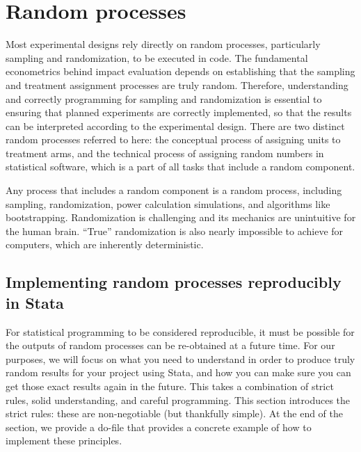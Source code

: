 
\section{Random processes}

Most experimental designs rely directly on random processes,
particularly sampling and randomization, to be executed in code.
The fundamental econometrics behind impact evaluation
depends on establishing that the sampling
and treatment assignment processes are truly random.
Therefore, understanding and correctly programming for sampling and randomization
is essential to ensuring that planned experiments
are correctly implemented, so that the results
can be interpreted according to the experimental design.
There are two distinct random processes referred to here:
the conceptual process of assigning units to treatment arms,
and the technical process of assigning random numbers in statistical software,
which is a part of all tasks that include a random component.

Any process that includes a random component is a random process,
including sampling, randomization, power calculation simulations, and algorithms like bootstrapping.
Randomization is challenging and its mechanics are unintuitive for the human brain.
``True'' randomization is also nearly impossible to achieve for computers,
which are inherently deterministic.

\subsection{Implementing random processes reproducibly in Stata}

For statistical programming to be considered reproducible, it must be possible for the outputs of random processes
can be re-obtained at a future time.\cite{orozco2018make}
For our purposes, we will focus on what you need to understand
in order to produce truly random results for your project using Stata,
and how you can make sure you can get those exact results again in the future.
This takes a combination of strict rules, solid understanding, and careful programming.
This section introduces the strict rules: these are non-negotiable (but thankfully simple). 
At the end of the section, 
we provide a do-file that provides a concrete example of how to implement these principles. 

